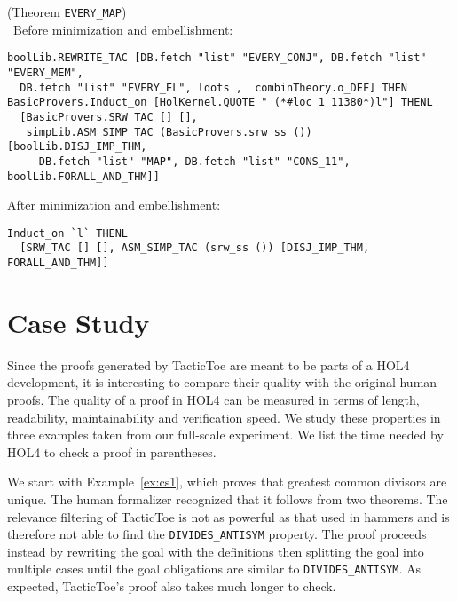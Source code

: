 \documentclass[runningheads,a4paper,draft]{svjour3}
\def\holfour{\textsf{HOL4}\xspace}
\def\tactictoe{\textsf{TacticToe}\xspace}
\begin{document}
\begin{example}(Theorem \texttt{EVERY\_MAP})\label{ex:pretty}\\\
Before minimization and embellishment:
\begin{lstlisting}[language=SMLSmall]
boolLib.REWRITE_TAC [DB.fetch "list" "EVERY_CONJ", DB.fetch "list" "EVERY_MEM",
  DB.fetch "list" "EVERY_EL", ldots ,  combinTheory.o_DEF] THEN
BasicProvers.Induct_on [HolKernel.QUOTE " (*#loc 1 11380*)l"] THENL
  [BasicProvers.SRW_TAC [] [],
   simpLib.ASM_SIMP_TAC (BasicProvers.srw_ss ()) [boolLib.DISJ_IMP_THM,
     DB.fetch "list" "MAP", DB.fetch "list" "CONS_11", boolLib.FORALL_AND_THM]]

\end{lstlisting}
After minimization and embellishment:
\begin{lstlisting}[language=SMLSmall]
Induct_on `l` THENL
  [SRW_TAC [] [], ASM_SIMP_TAC (srw_ss ()) [DISJ_IMP_THM, FORALL_AND_THM]]
\end{lstlisting}
\end{example}

\section{Case Study}\label{sec:case_study}
Since the proofs generated by \tactictoe are meant to be parts of a \holfour 
development, it is interesting to compare their quality with the original human 
proofs.
The quality of a proof in \holfour can be measured in terms of length, readability, maintainability and verification speed.
We study these properties in three examples taken from our full-scale experiment.
We list the time needed by \holfour to check a proof in parentheses.

We start with Example~\ref{ex:cs1}, which proves that greatest common divisors are unique.
The human formalizer recognized that it follows from two theorems.
The relevance filtering of \tactictoe is not as powerful as that used in hammers
and is therefore not able to find the \texttt{DIVIDES\_ANTISYM} property. The proof
proceeds instead by rewriting the
goal with the definitions then splitting the goal into multiple cases until the goal obligations are similar
to \texttt{DIVIDES\_ANTISYM}. As expected, \tactictoe's proof
also takes much longer to check.
\end{document}
